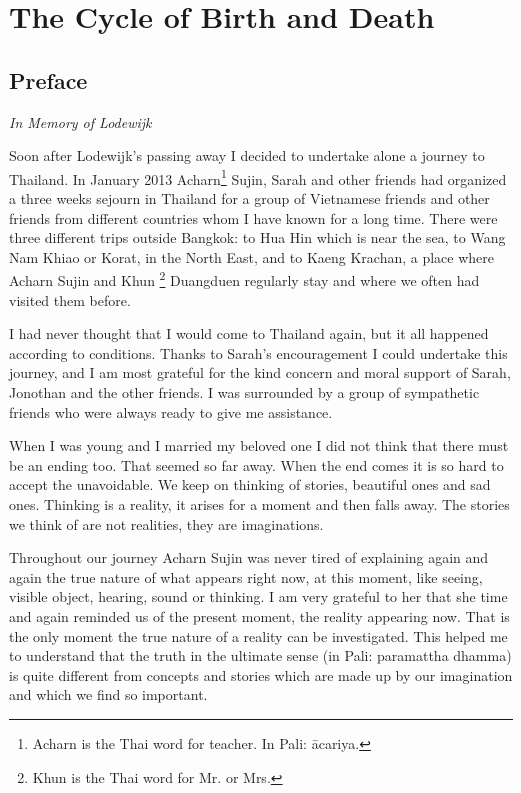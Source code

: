 \part{The Cycle of Birth and Death}
\chapter{Preface}

\begin{description}
\item \textit{In Memory of Lodewijk}
\end{description}


Soon after Lodewijk's passing away I decided to undertake alone a
journey to Thailand. In January 2013
Acharn\footnote{Acharn is the Thai word for
teacher. In Pali: ācariya.}
Sujin, Sarah and other friends had organized a three weeks sejourn in
Thailand for a group of Vietnamese friends and other friends from
different countries whom I have known for a long time. There were three
different trips outside Bangkok: to Hua Hin which is near the sea, to
Wang Nam Khiao or Korat, in the North East, and to Kaeng Krachan, a
place where Acharn Sujin and Khun
\footnote{Khun is the Thai word for Mr. or
Mrs.}
Duangduen regularly stay and where we often had visited them before.

I had never thought that I would come to Thailand again, but it all
happened according to conditions. Thanks to Sarah's encouragement I
could undertake this journey, and I am most grateful for the kind
concern and moral support of Sarah, Jonothan and the other friends. I
was surrounded by a group of sympathetic friends who were always ready
to give me assistance.

When I was young and I married my beloved one I did not think that there
must be an ending too. That seemed so far away. When the end comes it is
so hard to accept the unavoidable. We keep on thinking of stories,
beautiful ones and sad ones. Thinking is a reality, it arises for a
moment and then falls away. The stories we think of are not realities,
they are imaginations.

Throughout our journey Acharn Sujin was never tired of explaining again
and again the true nature of what appears right now, at this moment,
like seeing, visible object, hearing, sound or thinking. I am very
grateful to her that she time and again reminded us of the present
moment, the reality appearing now. That is the only moment the true
nature of a reality can be investigated. This helped me to understand
that the truth in the ultimate sense (in Pali: paramattha dhamma) is
quite different from concepts and stories which are made up by our
imagination and which we find so important.

